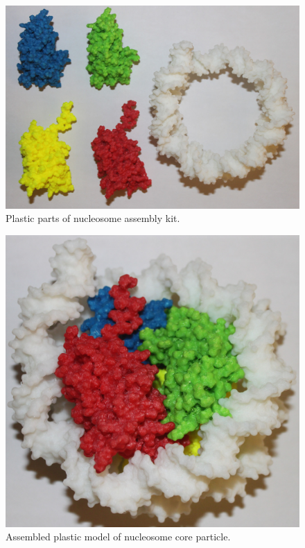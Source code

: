 \documentclass[12pt,onecolumn]{scrartcl}
\begin{document}
\begin{figure}[h]
\begin{center}
\includegraphics[width=1.0\textwidth]{img/nucl_parts} 
\caption{Plastic parts of nucleosome assembly kit.}
\label{parts}
\end{center}
\end{figure}

\begin{figure}[h]
\begin{center}
\includegraphics[width=1.0\textwidth]{img/nucl} 
\caption{Assembled plastic model of nucleosome core particle.}
\label{nucl}
\end{center}
\end{figure}



%

%

\end{document}
